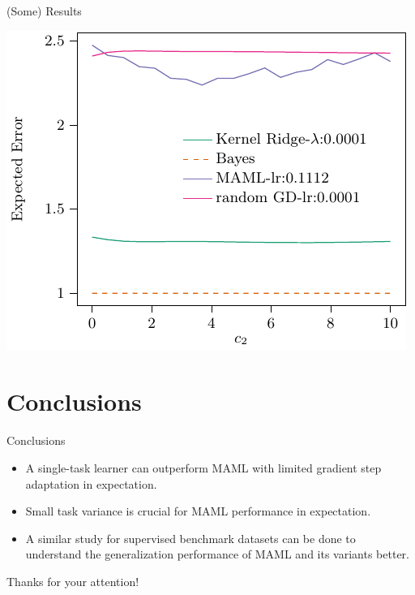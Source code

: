 \documentclass[aspectratio=169]{beamer}
\begin{document}
\begin{frame}{(Some) Results}
{\begin{minipage}{0.3\textwidth}
      \includegraphics[width=\textwidth]{figures/nonlin_c_3}    
    \end{minipage}
  }
\end{frame}

\section{Conclusions}
\begin{frame}{Conclusions}
  \begin{itemize}
    \item A single-task learner can outperform MAML with limited gradient step adaptation in expectation.
    \item Small task variance is crucial for MAML performance in expectation.
    \item A similar study for supervised benchmark datasets can be done to understand the generalization performance of MAML and its variants better.
  \end{itemize}
\end{frame}

%

\begin{frame}
  \centering
  \color{Pink} Thanks for your attention!
\end{frame}
\end{document}
